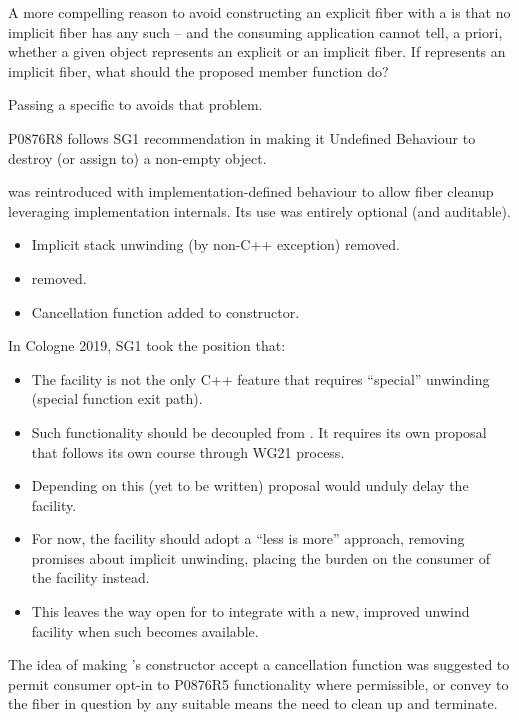 A more compelling reason to avoid constructing an explicit fiber with
a \cancelfn is that no implicit fiber has any such \cancelfn\xspace -- and the
consuming application cannot tell, a priori, whether a given \fiber object
represents an explicit or an implicit fiber. If \this represents an
implicit fiber, what should the proposed  member function do?

Passing a specific \cancelfn to \anyresumewith avoids that problem.

P0876R8 follows SG1 recommendation in making it Undefined Behaviour to destroy
(or assign to) a non-empty \fiber object.

\unwindfib was reintroduced with implementation-defined behaviour to allow fiber
cleanup leveraging implementation internals. Its use was entirely optional (and
auditable). 


\begin{itemize}
    \item Implicit stack unwinding (by non-C++ exception) removed.
    \item \unwindfib removed.
    \item Cancellation function added to \fiber constructor.
\end{itemize}

In Cologne 2019, SG1 took the position that:

\begin{itemize}
    \item The \fiber facility is not the only C++ feature that
          requires ``special'' unwinding (special function exit path).
    \item Such functionality should be decoupled from \fiber. It requires its
          own proposal that follows its own course through WG21 process.
    \item Depending on this (yet to be written) proposal would unduly delay
          the \fiber facility.
    \item For now, the \fiber facility should adopt a ``less is
          more'' approach, removing promises about implicit unwinding, placing
          the burden on the consumer of the facility instead.
    \item This leaves the way open for \fiber to integrate with
          a new, improved unwind facility when such becomes available.
\end{itemize}

The idea of making \fiber's constructor accept a cancellation function was
suggested to permit consumer opt-in to P0876R5 functionality where
permissible, or convey to the fiber in question by any suitable means the need
to clean up and terminate.

